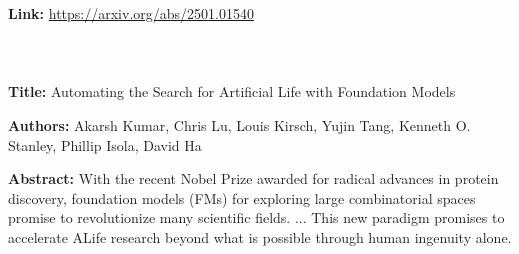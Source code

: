 \begin{textcolorbox}
\textbf{Link:} \url{https://arxiv.org/abs/2501.01540}
\\\\
\\\\
\textbf{Title:} Automating the Search for Artificial Life with Foundation Models

\textbf{Authors:} Akarsh Kumar, Chris Lu, Louis Kirsch, Yujin Tang, Kenneth O. Stanley, Phillip Isola, David Ha

\textbf{Abstract:}  With the recent Nobel Prize awarded for radical advances in protein discovery, foundation models (FMs) for exploring large combinatorial spaces promise to revolutionize many scientific fields. 
...
This new paradigm promises to accelerate ALife research beyond what is possible through human ingenuity alone.


\end{textcolorbox}
